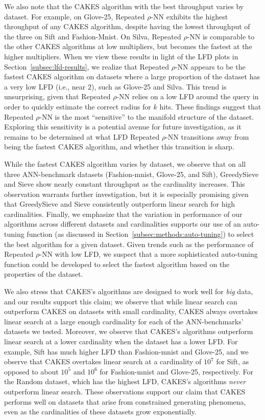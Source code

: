 We also note that the CAKES algorithm with the best throughput varies by dataset.
For example, on Glove-25, Repeated $\rho$-NN exhibits the highest throughput of any CAKES algorithm, despite having the lowest throughput of the three on Sift and Fashion-Mnist. 
On Silva, Repeated $\rho$-NN is comparable to the other CAKES algorithms at low multipliers, but becomes the fastest at the higher multipliers. 
When we view these results in light of the LFD plots in Section~\ref{subsec:lfd-results}, we realize that Repeated $\rho$-NN appears to be the fastest CAKES algorithm on datasets where a large proportion of the dataset has a very low LFD (i.e., near $2$), such as Glove-25 and Silva. 
This trend is unsurprising, given that Repeated $\rho$-NN relies on a low LFD around the query in order to quickly estimate the correct radius for $k$ hits. 
These findings suggest that Repeated $\rho$-NN is the most ``sensitive'' to the manifold structure of the dataset.
Exploring this sensitivity is a potential avenue for future investigation, as it remains to be determined at what LFD Repeated $\rho$-NN transitions away from being the fastest CAKES algorithm, and whether this transition is sharp.

While the fastest CAKES algorithm varies by dataset, we observe that on all three ANN-benchmark datasets (Fashion-mnist, Glove-25, and Sift), GreedySieve and Sieve show nearly constant throughput as the cardinality increases.
This observation warrants further investigation, but it is especially promising given that GreedySieve and Sieve consistently outperform linear search for high cardinalities.
Finally, we emphasize that the variation in performance of our algorithms across different datasets and cardinalities supports our use of an auto-tuning function (as discussed in Section~\ref{subsec:methods:auto-tuning}) to select the best algorithm for a given dataset.
Given trends such as the performance of Repeated $\rho$-NN with low LFD, we suspect that a more sophisticated auto-tuning function could be developed to select the fastest algorithm based on the properties of the dataset.

We also stress that CAKES's algorithms are designed to work well for \emph{big} data, and our results support this claim;
we observe that while linear search can outperform CAKES on datasets with small cardinality, CAKES always overtakes linear search at a large enough cardinality for each of the ANN-benchmarks' datasets we tested.
Moreover, we observe that CAKES's algorithms outperform linear search at a lower cardinality when the dataset has a lower LFD.
For example, Sift has much higher LFD than Fashion-mnist and Glove-25, and we observe that CAKES overtakes linear search at a cardinality of $10^7$ for Sift, as opposed to about $10^5$ and $10^6$ for Fashion-mnist and Glove-25, respectively.
For the Random dataset, which has the highest LFD, CAKES's algorithms \emph{never} outperform linear search.
These observations support our claim that CAKES performs well on datasets that arise from constrained generating phenomena, even as the cardinalities of these datasets grow exponentially.

